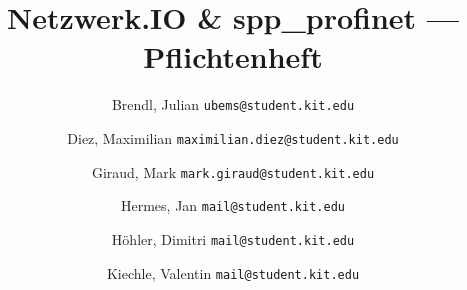 \documentclass[a4paper]{scrreprt}
\newcommand{\sppname}{spp\_profinet }
\newcommand{\programname}{Netzwerk.IO }
\begin{document}
\title{\programname \& \sppname --- Pflichtenheft}
\author{
    Brendl, Julian
    \texttt{ubems@student.kit.edu}
    \and
    Diez, Maximilian
    \texttt{maximilian.diez@student.kit.edu}
    \and
    Giraud, Mark
    \texttt{mark.giraud@student.kit.edu}
    \and
    Hermes, Jan
    \texttt{mail@student.kit.edu}
    \and
    Höhler, Dimitri
    \texttt{mail@student.kit.edu}
    \and
    Kiechle, Valentin
    \texttt{mail@student.kit.edu}
}
\maketitle



\newpage
\tableofcontents
\newpage



















\appendix

\end{document}

